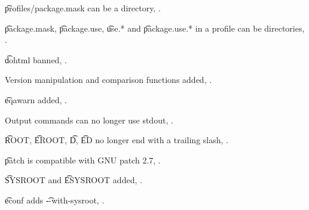 \begin{compactitem}
\item \t{profiles/package.mask} can be a directory, .
\item \t{package.mask}, \t{package.use}, \t{use.*} and \t{package.use.*} in a profile can be
    directories, .
\item \t{dohtml} banned, .
\item Version manipulation and comparison functions added, .
\item \t{eqawarn} added, .
\item Output commands can no longer use stdout, .
\item \t{ROOT}, \t{EROOT}, \t{D}, \t{ED} no longer end with a trailing slash,
    .
\item \t{patch} is compatible with GNU patch 2.7, .
\item \t{SYSROOT} and \t{ESYSROOT} added, .
\item \t{econf} adds \t{-{}-with-sysroot}, .
\end{compactitem}




